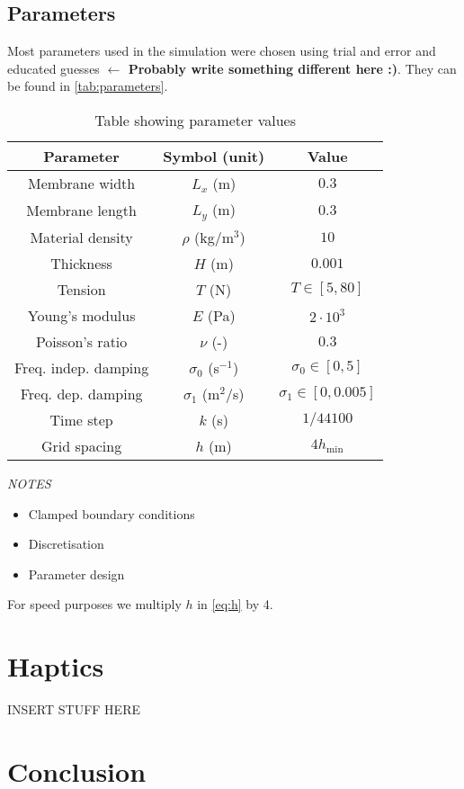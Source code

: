 \documentclass{vgtc}
\begin{document}
\subsection{Parameters}
Most parameters used in the simulation were chosen using trial and error and educated guesses \textbf{$\leftarrow$ Probably write something different here :)}. They can be found in \autoref{tab:parameters}.
\begin{table}[h]
\caption{Table showing parameter values}\label{tab:parameters}
\centering
\begin{tabular}{|c|c|c|}
    \hline
    Parameter & Symbol (unit) & Value \\
    \hline
    Membrane width & $L_x$ (m) & $0.3$\\
    Membrane length & $L_y$ (m) & $0.3$ \\
    Material density & $\rho$ (kg/m$^3$)& $10$ \\
    Thickness & $H$ (m) & $0.001$ \\
    Tension & $T$ (N) & $T \in [5, 80]$ \\
    Young's modulus & $E$ (Pa)& $2\cdot 10^3$ \\
    Poisson's ratio & $\nu$ (-)& $0.3$ \\
    Freq. indep. damping & $\sigma_0$ (s$^{-1}$) & $\sigma_0 \in [0, 5]$\\
    Freq. dep. damping & $\sigma_1$ (m$^2$/s) & $\sigma_1 \in [0, 0.005]$\\
    Time step & $k$ (s) & $1/44100$\\
    Grid spacing & $h$ (m) & $4h_\text{min}$\\
    \hline
\end{tabular}
\end{table}\vspace{1em}

\textit{NOTES}
\begin{itemize}
    \item Clamped boundary conditions
    \item Discretisation
    \item Parameter design
\end{itemize}

For speed purposes we multiply $h$ in \autoref{eq:h} by 4.

\section{Haptics}
INSERT STUFF HERE

\section{Conclusion}
\end{document}
